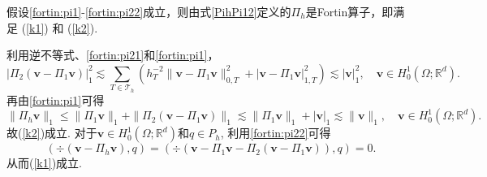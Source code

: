 \begin{lemma}\label{lem:fortinoperator}
假设\eqref{fortin:pi1}-\eqref{fortin:pi22}成立，则由式\eqref{PihPi12}定义的$\Pi_{h}$是Fortin算子，即满足 (\ref{k1}) 和 (\ref{k2}).
\end{lemma}
\begin{prf}	
利用逆不等式、\eqref{fortin:pi21}和\eqref{fortin:pi1}，
\begin{equation*}
|\Pi_{2}(\boldsymbol{v}-\Pi_{1}\boldsymbol{v})|_1^2\lesssim \sum_{T\in\mathcal T_h}(h_T^{-2}\|\boldsymbol{v}-\Pi_{1}\boldsymbol{v}\|_{0,T}^2 + |\boldsymbol{v}-\Pi_{1}\boldsymbol{v}|_{1,T}^2)\lesssim |\boldsymbol{v}|_1^2, \quad\boldsymbol{v}\in H_0^{1}(\Omega; \mathbb{R}^{d}).
\end{equation*}
再由\eqref{fortin:pi1}可得
\begin{equation*}
\|\Pi_{h}\boldsymbol{v}\|_{1}\leq\|\Pi_{1}\boldsymbol{v}\|_1
+\|\Pi_{2}(\boldsymbol{v}-\Pi_{1}\boldsymbol{v})\|_1\lesssim \|\Pi_{1}\boldsymbol{v}\|_1+|\boldsymbol{v}|_1\lesssim \|\boldsymbol{v}\|_1, \quad \boldsymbol{v}\in H_0^{1}(\Omega; \mathbb{R}^{d}).
\end{equation*}
故(\ref{k2})成立.
对于$\boldsymbol{v}\in H_0^{1}(\Omega; \mathbb{R}^{d})$和$q\in P_h$, 利用\eqref{fortin:pi22}可得
\begin{equation*}
(\div(\boldsymbol{v}-\Pi_h\boldsymbol{v}),q)
=(\div(\boldsymbol{v}-\Pi_{1}\boldsymbol{v}
-\Pi_{2}(\boldsymbol{v}-\Pi_{1}\boldsymbol{v})),q)=0.
\end{equation*}
从而(\ref{k1})成立.
\end{prf}

